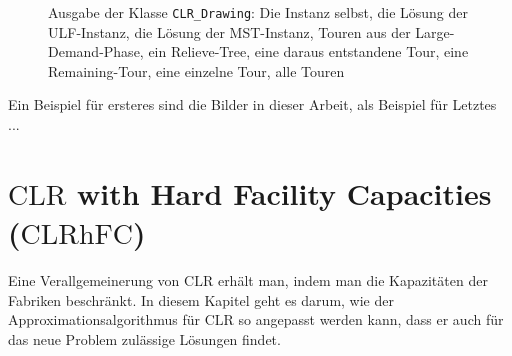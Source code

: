 \documentclass[a4paper,ngerman,11pt,bibtotoc]{scrartcl}
\theoremstyle{definition}
\theoremstyle{plain}
\theoremstyle{remark}
\newcommand{\CLR}{\mathrm{CLR}}
\newcommand{\CLRHFC}{\mathrm{CLRhFC}}
\begin{document}
\begin{figure}[H]
	
	\caption{Ausgabe der Klasse \texttt{CLR\_Drawing}: Die Instanz selbst, die Lösung der ULF-Instanz, die Lösung der MST-Instanz, Touren aus der Large-Demand-Phase, ein Relieve-Tree, eine daraus entstandene Tour, eine Remaining-Tour, eine einzelne Tour, alle Touren}
\end{figure}

Ein Beispiel für ersteres sind die Bilder in dieser Arbeit, als Beispiel für Letztes ...


	

\section{$\CLR$ with Hard Facility Capacities ($\CLRHFC$)}

Eine Verallgemeinerung von $\CLR$ erhält man, indem man die Kapazitäten der Fabriken beschränkt. In diesem Kapitel geht es darum, wie der Approximationsalgorithmus für $\CLR$ so angepasst werden kann, dass er auch für das neue Problem zulässige Lösungen findet.
\end{document}
